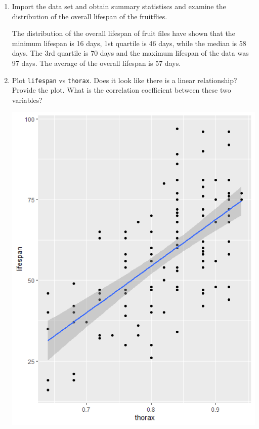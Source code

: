 \documentclass[12pt,letterpaper]{article}
\begin{document}
\begin{enumerate}
	
	\item
	Import the data set and obtain summary statistiscs and examine the distribution of the overall lifespan of the fruitflies.  
	


The distribution of the overall lifespan of fruit files have shown that the minimum lifespan is 16 days, 1st quartile is 46 days, while the median is 58 days. The 3rd quartile is 70 days and the maximum lifespan of the data was 97 days. The average of the overall lifespan is 57 days.

\newpage
	\item
	Plot \texttt{lifespan} vs \texttt{thorax}. Does it look like there is a linear relationship? Provide the plot. What is the correlation coefficient between these two variables?
	


\includegraphics{Q32}


\end{enumerate}
\end{document}
